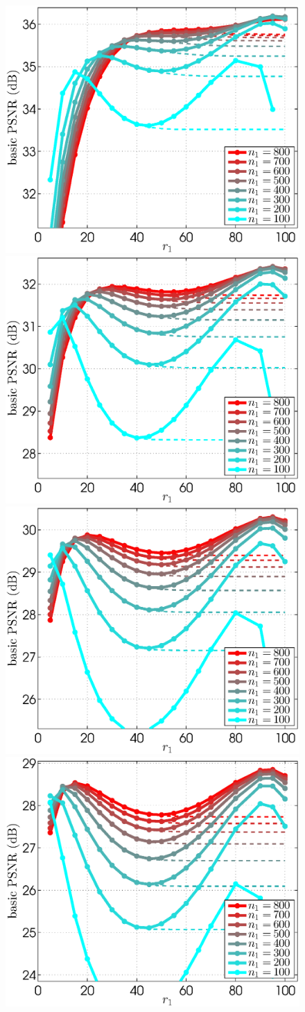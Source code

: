 \documentclass[10pt, journal, twocolumn, final, a4paper]{IEEEtran}
\begin{document}
\begin{figure}[htpb!]
	\begin{center}
		\includegraphics[width=.25\textwidth]{figs/params_tables/bpsnr_r1-np1-curves_s10_average_derf_neg-vs-pos-weights.eps}%
		\includegraphics[width=.25\textwidth]{figs/params_tables/bpsnr_r1-np1-curves_s20_average_derf_neg-vs-pos-weights.eps}%
		\includegraphics[width=.25\textwidth]{figs/params_tables/bpsnr_r1-np1-curves_s30_average_derf_neg-vs-pos-weights.eps}%
		\includegraphics[width=.25\textwidth]{figs/params_tables/bpsnr_r1-np1-curves_s40_average_derf_neg-vs-pos-weights.eps}\\


\end{center}
\end{figure}
\end{document}
